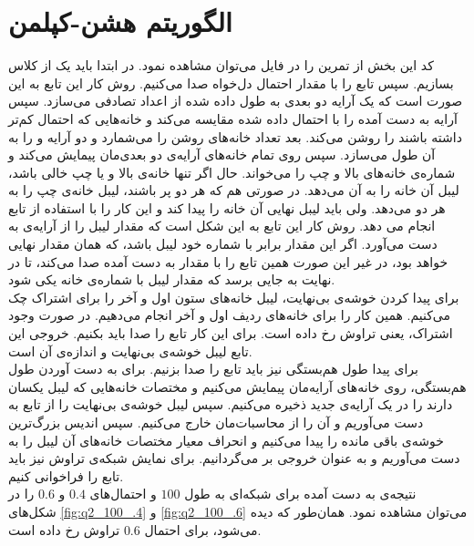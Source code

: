 \documentclass[11pt, a4paper]{article}
\begin{document}
\section{\textbf{الگوریتم هشن-کپلمن}}
کد این بخش از تمرین را در فایل
می‌توان مشاهده نمود.
در ابتدا باید یک
از کلاس
بسازیم.
سپس تابع
را با مقدار احتمال دل‌خواه صدا می‌کنیم.
روش کار این تابع به این صورت است که یک آرایه دو بعدی به طول داده شده از اعداد تصادفی می‌سازد.
سپس آرایه به دست آمده را با احتمال داده شده مقایسه می‌کند و خانه‌هایی که احتمال کم‌تر داشته باشند را روشن می‌کند.
بعد تعداد خانه‌های روشن را می‌شمارد و دو آرایه
و
را به آن طول می‌سازد.
سپس روی تمام خانه‌های آرایه‌ی دو بعدی‌مان پیمایش می‌کند و شماره‌ی خانه‌های بالا و چپ را می‌خواند.
حال اگر تنها خانه‌ی بالا و یا چپ خالی باشد،
لیبل آن خانه را به آن می‌دهد.
در صورتی هم که هر دو پر باشند، لیبل خانه‌ی چپ را به هر دو می‌دهد.
ولی باید لیبل نهایی آن خانه را پیدا کند و این کار را با استفاده از تابع
انجام می دهد.
روش کار این تابع به این شکل است که مقدار لیبل را از آرایه‌ی
به دست می‌آورد. اگر این مقدار برابر با شماره خود لیبل باشد،
که همان مقدار نهایی خواهد بود، در غیر این صورت همین تابع را با مقدار به دست‌ آمده صدا می‌کند،
تا در نهایت به جایی برسد که مقدار لیبل با شماره‌ی خانه یکی شود.
\\
برای پیدا کردن خوشه‌ی بی‌نهایت، لیبل خانه‌های ستون اول و آخر را برای اشتراک چک می‌کنیم.
همین کار را برای خانه‌های ردیف اول و آخر انجام می‌دهیم. در صورت وجود اشتراک، یعنی تراوش رخ داده است.
برای این کار تابع
را صدا باید بکنیم. خروجی این تابع لیبل خوشه‌ی بی‌نهایت و اندازه‌ی آن است.
\\
برای پیدا طول هم‌بستگی نیز باید تابع
را صدا بزنیم. 
برای به دست آوردن طول هم‌بستگی، روی خانه‌های آرایه‌مان پیمایش می‌کنیم و
‌مختصات خانه‌هایی که لیبل یکسان دارند را در یک آرایه‌ی جدید ذخیره می‌کنیم.
سپس لیبل خوشه‌ی بی‌نهایت را از تابع
به دست می‌آوریم و آن را از محاسبات‌مان خارج می‌کنیم.
سپس اندیس بزرگ‌ترین خوشه‌ی باقی مانده را پیدا می‌کنیم و
انحراف معیار مختصات خانه‌های آن لیبل را به دست می‌آوریم و به عنوان خروجی بر می‌گردانیم.
برای نمایش شبکه‌ی تراوش نیز باید تابع
را فراخوانی کنیم.
\\
نتیجه‌ی به دست آمده برای شبکه‌ای به طول
$100$
و احتمال‌های
$0.4$
و
$0.6$
را در شکل‌های
\ref{fig:q2_100_.4}
و
\ref{fig:q2_100_.6}
می‌توان مشاهده نمود.
همان‌طور که دیده می‌شود، برای احتمال
$0.6$
تراوش رخ داده است.
\end{document}
